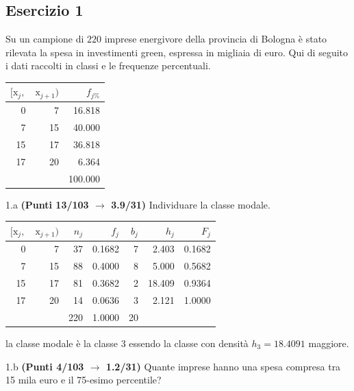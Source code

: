 \documentclass[
  11pt,
]{book}
\theoremstyle{mytheoremstyle}
\theoremstyle{mydefstyle}
\newenvironment{sol}
  {
  \begin{tcolorbox}[enhanced,breakable,arc=0.1mm,boxrule=1pt,colback=white,colframe=iblue,
  title=\bf \fontfamily{lmss}\selectfont \hspace{.5 cm} Soluzione,drop fuzzy shadow]

}{
\end{tcolorbox}
  }
\begin{document}
\subsection{Esercizio 1}\label{esercizio-1-13}

Su un campione di \(220\) imprese energivore della provincia di Bologna è stato
rilevata la spesa in investimenti green, espressa in migliaia di euro. Qui di seguito i dati raccolti in classi
e le frequenze percentuali.

\begin{table}[H]
\centering
\begin{tabular}{rrr}
\toprule
$[\text{x}_j,$ & $\text{x}_{j+1})$ & $f_{j\%}$\\
\midrule
0 & 7 & 16.818\\
7 & 15 & 40.000\\
15 & 17 & 36.818\\
17 & 20 & 6.364\\
 &  & 100.000\\
\bottomrule
\end{tabular}
\end{table}

1.a \textbf{(Punti 13/103 \(\rightarrow\) 3.9/31)} Individuare la classe modale.

\begin{sol}

\begin{table}[H]
\centering
\begin{tabular}{rrrrrrr}
\toprule
$[\text{x}_j,$ & $\text{x}_{j+1})$ & $n_j$ & $f_j$ & $b_j$ & $h_j$ & $F_j$\\
\midrule
0 & 7 & 37 & 0.1682 & 7 & 2.403 & 0.1682\\
7 & 15 & 88 & 0.4000 & 8 & 5.000 & 0.5682\\
15 & 17 & 81 & 0.3682 & 2 & 18.409 & 0.9364\\
17 & 20 & 14 & 0.0636 & 3 & 2.121 & 1.0000\\
 &  & 220 & 1.0000 & 20 &  & \\
\bottomrule
\end{tabular}
\end{table}

la classe modale è la classe \(3\) essendo la classe con densità \(h_{3}=18.4091\) maggiore.

\end{sol}

1.b \textbf{(Punti 4/103 \(\rightarrow\) 1.2/31)} Quante imprese hanno una spesa compresa tra 15 mila euro e il 75-esimo percentile?
\end{document}
